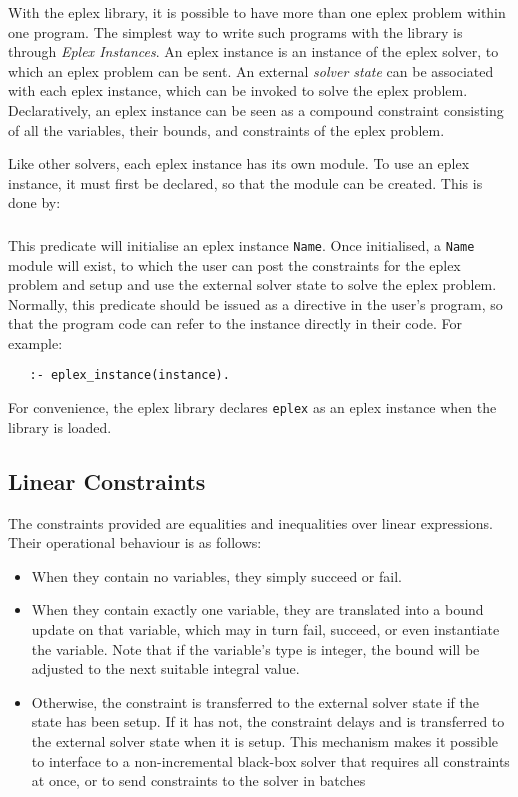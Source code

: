 With the eplex library, it is possible to have more than one eplex problem
within one program. The simplest way to write such programs with the
library is through {\it Eplex Instances}. An eplex instance is an instance
of the eplex solver, to which an eplex problem can be sent. An external
{\it solver state} can be associated with each eplex instance, which can be
invoked to solve the eplex problem. Declaratively, an eplex instance can be
seen as a compound constraint consisting of all the variables, their bounds, and
constraints of the eplex problem.

Like other solvers, each eplex instance has its own module. To use an eplex
instance, it must first be declared, so that the module can be created.
This is done by:

\subsubsection{}

This predicate will initialise an eplex instance {\tt Name}. Once
initialised, a {\tt Name} module will exist, to which the user can post the 
constraints for the eplex problem and setup and use the external solver
state to solve the eplex problem. Normally, this predicate should be issued
as a directive in the user's program, so that the program code can refer to
the instance directly in their code. For example:

\begin{verbatim}
   :- eplex_instance(instance).
\end{verbatim}


For convenience, the eplex library declares {\tt eplex} as an eplex instance 
when the library is loaded. 

\subsection{Linear Constraints}
\label{linear-constraints}
The constraints provided are equalities and inequalities over
linear expressions.
Their operational behaviour is as follows:
\begin{itemize}
\item When they contain no variables, they simply succeed or fail.
\item When they contain exactly one variable, they are translated into
a bound update on that variable, which may in turn fail, succeed,
or even instantiate the variable.
Note that if the variable's type is integer, the bound will be adjusted
to the next suitable integral value.
\item Otherwise, the constraint is transferred to the external solver state
if the state has been setup. If it has not, the constraint
delays and is transferred to the external solver state when it is setup.
This mechanism makes it possible to interface to a non-incremental
black-box solver that requires all constraints at once,
or to send constraints to the solver in batches
\end{itemize}


